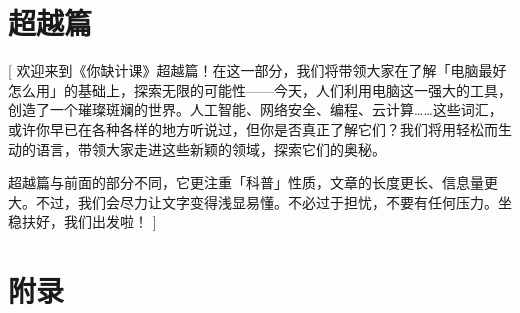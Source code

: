 \documentclass[a4paper]{book}
\begin{document}







\part{超越篇}[
  欢迎来到《你缺计课》超越篇！在这一部分，我们将带领大家在了解「电脑最好怎么用」的基础上，探索无限的可能性——今天，人们利用电脑这一强大的工具，创造了一个璀璨斑斓的世界。人工智能、网络安全、编程、云计算……这些词汇，或许你早已在各种各样的地方听说过，但你是否真正了解它们？我们将用轻松而生动的语言，带领大家走进这些新颖的领域，探索它们的奥秘。

  超越篇与前面的部分不同，它更注重「科普」性质，文章的长度更长、信息量更大。不过，我们会尽力让文字变得浅显易懂。不必过于担忧，不要有任何压力。坐稳扶好，我们出发啦！
]






\appendix
\part{附录}







\backmatter

\end{document}
